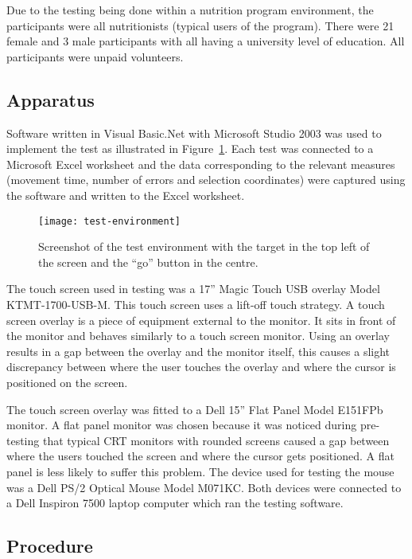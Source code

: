 \documentclass{elsart}
\begin{document}
Due to the testing being done within a nutrition program environment,
the participants were all nutritionists (typical users of the program).
There were 21 female and 3 male participants with all having a
university level of education. All participants were unpaid volunteers.

\subsection{Apparatus}
\label{sec-method-apparatus}

Software written in Visual Basic.Net with Microsoft Studio 2003 was used
to implement the test as illustrated in
Figure~\ref{fig-test-environment}. Each test was connected to a Microsoft
Excel worksheet and the data corresponding to the relevant measures
(movement time, number of errors and selection coordinates) were
captured using the software and written to the Excel worksheet.

\begin{figure}
	\centering
	\texttt{[image: test-environment]}
	\caption{Screenshot of the test environment with the target in the
	top left of the screen and the ``go'' button in the centre.}
	\label{fig-test-environment}
\end{figure}

The touch screen used in testing was a 17'' Magic Touch USB overlay
Model KTMT-1700-USB-M. This touch screen uses a lift-off touch strategy.
A touch screen overlay is a piece of equipment external to the monitor.
It sits in front of the monitor and behaves similarly to a touch screen
monitor. Using an overlay results in a gap between the overlay and the
monitor itself, this causes a slight discrepancy between where the user
touches the overlay and where the cursor is positioned on the screen.

The touch screen overlay was fitted to a Dell 15'' Flat Panel Model
E151FPb monitor. A flat panel monitor was chosen because it was noticed
during pre-testing that typical CRT monitors with rounded screens caused
a gap between where the users touched the screen and where the cursor
gets positioned. A flat panel is less likely to suffer this problem. The
device used for testing the mouse was a Dell PS/2 Optical Mouse Model
M071KC. Both devices were connected to a Dell Inspiron 7500 laptop
computer which ran the testing software.

\subsection{Procedure}
\label{sec-method-procedure}
\end{document}
